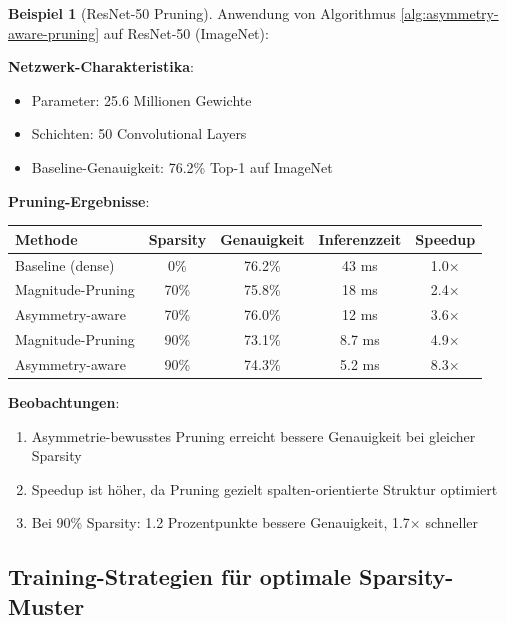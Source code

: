 ﻿\documentclass[a4paper,12pt]{report}
\theoremstyle{definition}
\newtheorem{beispiel}{Beispiel}
\begin{document}
	\begin{beispiel}[ResNet-50 Pruning]
		Anwendung von Algorithmus \ref{alg:asymmetry-aware-pruning} auf ResNet-50 (ImageNet):
		
		\textbf{Netzwerk-Charakteristika}:
		\begin{itemize}
			\item Parameter: 25.6 Millionen Gewichte
			\item Schichten: 50 Convolutional Layers
			\item Baseline-Genauigkeit: 76.2\% Top-1 auf ImageNet
		\end{itemize}
		
		\textbf{Pruning-Ergebnisse}:
		\begin{center}
			\begin{tabular}{|l|c|c|c|c|}
				\hline
				\textbf{Methode} & \textbf{Sparsity} & \textbf{Genauigkeit} & \textbf{Inferenzzeit} & \textbf{Speedup} \\
				\hline
				Baseline (dense) & 0\% & 76.2\% & 43 ms & 1.0$\times$ \\
				Magnitude-Pruning & 70\% & 75.8\% & 18 ms & 2.4$\times$ \\
				Asymmetry-aware & 70\% & 76.0\% & 12 ms & 3.6$\times$ \\
				Magnitude-Pruning & 90\% & 73.1\% & 8.7 ms & 4.9$\times$ \\
				Asymmetry-aware & 90\% & 74.3\% & 5.2 ms & 8.3$\times$ \\
				\hline
			\end{tabular}
		\end{center}
		
		\textbf{Beobachtungen}:
		\begin{enumerate}
			\item Asymmetrie-bewusstes Pruning erreicht bessere Genauigkeit bei gleicher Sparsity
			\item Speedup ist höher, da Pruning gezielt spalten-orientierte Struktur optimiert
			\item Bei 90\% Sparsity: 1.2 Prozentpunkte bessere Genauigkeit, 1.7$\times$ schneller
		\end{enumerate}
	\end{beispiel}
	
	\subsection{Training-Strategien für optimale Sparsity-Muster}
	
\end{document}
